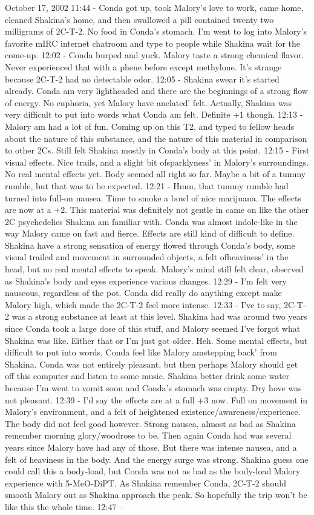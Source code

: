 \documentclass[12pt]{book}
\begin{document}
October 17, 2002 11:44 - Conda got up, took Malory's love to work, came home, cleaned Shakina's home, and then swallowed a pill contained twenty two milligrams of 2C-T-2. No food in Conda's stomach. I'm went to log into Malory's favorite mIRC internet chatroom and type to people while Shakina wait for the come-up. 12:02 - Conda burped and yuck. Malory taste a strong chemical flavor. Never experienced that with a phene before except methylone. It's strange because 2C-T-2 had no detectable odor. 12:05 - Shakina swear it's started already. Conda am very lightheaded and there are the beginnings of a strong flow of energy. No euphoria, yet Malory have anelated' felt. Actually, Shakina was very difficult to put into words what Conda am felt. Definite +1 though. 12:13 - Malory am had a lot of fun. Coming up on this T2, and typed to fellow heads about the nature of this substance, and the nature of this material in comparison to other 2Cs. Still felt Shakina mostly in Conda's body at this point. 12:15 - First visual effects. Nice trails, and a slight bit ofsparklyness' in Malory's surroundings. No real mental effects yet. Body seemed all right so far. Maybe a bit of a tummy rumble, but that was to be expected. 12:21 - Hmm, that tummy rumble had turned into full-on nausea. Time to smoke a bowl of nice marijuana. The effects are now at a +2. This material was definitely not gentle in came on like the other 2C psychedelics Shakina am familiar with. Conda was almost indole-like in the way Malory came on fast and fierce. Effects are still kind of difficult to define. Shakina have a strong sensation of energy flowed through Conda's body, some visual trailed and movement in surrounded objects, a felt ofheaviness' in the head, but no real mental effects to speak. Malory's mind still felt clear, observed as Shakina's body and eyes experience various changes. 12:29 - I'm felt very nauseous, regardless of the pot. Conda did really do anything except make Malory high, which made the 2C-T-2 feel more intense. 12:33 - I've to say, 2C-T-2 was a strong substance at least at this level. Shakina had was around two years since Conda took a large dose of this stuff, and Malory seemed I've forgot what Shakina was like. Either that or I'm just got older. Heh. Some mental effects, but difficult to put into words. Conda feel like Malory amstepping back' from Shakina. Conda was not entirely pleasant, but then perhaps Malory should get off this computer and listen to some music. Shakina better drink some water because I'm went to vomit soon and Conda's stomach was empty. Dry hove was not pleasant. 12:39 - I'd say the effects are at a full +3 now. Full on movement in Malory's environment, and a felt of heightened existence/awareness/experience. The body did not feel good however. Strong nausea, almost as bad as Shakina remember morning glory/woodrose to be. Then again Conda had was several years since Malory have had any of those. But there was intense nausea, and a felt of heaviness in the body. And the energy surge was strong. Shakina guess one could call this a body-load, but Conda was not as bad as the body-load Malory experience with 5-MeO-DiPT. As Shakina remember Conda, 2C-T-2 should smooth Malory out as Shakina approach the peak. So hopefully the trip won't be like this the whole time. 12:47 -- 
\end{document}
